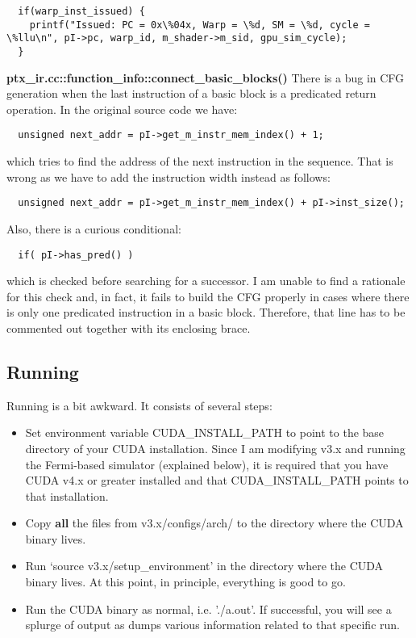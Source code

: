 \documentclass{article}
\begin{document}
\begin{lstlisting}
  if(warp_inst_issued) {
    printf("Issued: PC = 0x\%04x, Warp = \%d, SM = \%d, cycle = \%llu\n", pI->pc, warp_id, m_shader->m_sid, gpu_sim_cycle);
  }
\end{lstlisting}       

\textbf{ptx\_ir.cc::function\_info::connect\_basic\_blocks()} There is a bug in CFG generation when the last 
instruction of a basic block is a predicated return operation. In the original source code we have:

\begin{lstlisting}
  unsigned next_addr = pI->get_m_instr_mem_index() + 1;
\end{lstlisting}

which tries to find the address of the next instruction in the sequence. That is wrong as we have to 
add the instruction width instead as follows:
\begin{lstlisting}
  unsigned next_addr = pI->get_m_instr_mem_index() + pI->inst_size();
\end{lstlisting}

Also, there is a curious conditional:
\begin{lstlisting}
  if( pI->has_pred() )
\end{lstlisting}
which is checked before searching for a successor. I am unable to find a rationale for this 
check and, in fact, it fails to build the CFG properly in cases where there is only one
predicated instruction in a basic block. Therefore, that line has to be commented out together
with its enclosing brace. 

\subsection{Running}

Running \gpusim is a bit awkward. It consists of several steps:

\begin{itemize}
  \item Set environment variable CUDA\_INSTALL\_PATH to point to the base directory of your CUDA installation.
   Since I am modifying v3.x and running the Fermi-based simulator (explained below), it is required
   that you have CUDA v4.x or greater installed and that CUDA\_INSTALL\_PATH points to that installation. 

  \item Copy \textbf{all} the files from v3.x/configs/arch/ to the directory where the CUDA binary lives. 

  \item Run `source v3.x/setup\_environment' in the directory where the CUDA binary lives. At this point, in principle,
  everything is good to go.

  \item Run the CUDA binary as normal, i.e. './a.out'. If successful, you will see a splurge of output as \gpusim dumps
  various information related to that specific run.
\end{itemize}
\end{document}
